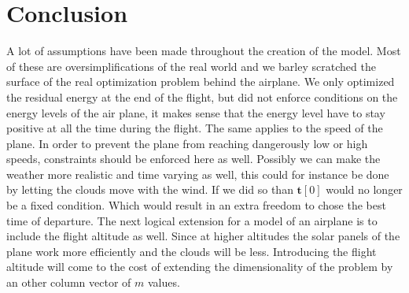 \section{Conclusion}
A lot of assumptions have been made throughout the creation of the model.
Most of these are oversimplifications of the real world and we barley scratched the surface of the real optimization problem behind the airplane.
We only optimized the residual energy at the end of the flight, but did not enforce conditions on the energy levels of the air plane, it makes sense that the energy level have to stay positive at all the time during the flight.
The same applies to the speed of the plane.
In order to prevent the plane from reaching dangerously low or high speeds, constraints should be enforced here as well.
Possibly we can make the weather more realistic and time varying as well, this could for instance be done by letting the clouds move with the wind.
If we did so than $ \mathbf{t}[0] $ would no longer be a fixed condition.
Which would result in an extra freedom  to chose the best time of departure.
The next logical extension for a model of an airplane is to include the flight altitude as well.
Since at higher altitudes the solar panels of the plane work more efficiently and the clouds will be less.
Introducing the flight altitude will come to the cost of extending the dimensionality of the problem by an other column vector of $ m $ values.




